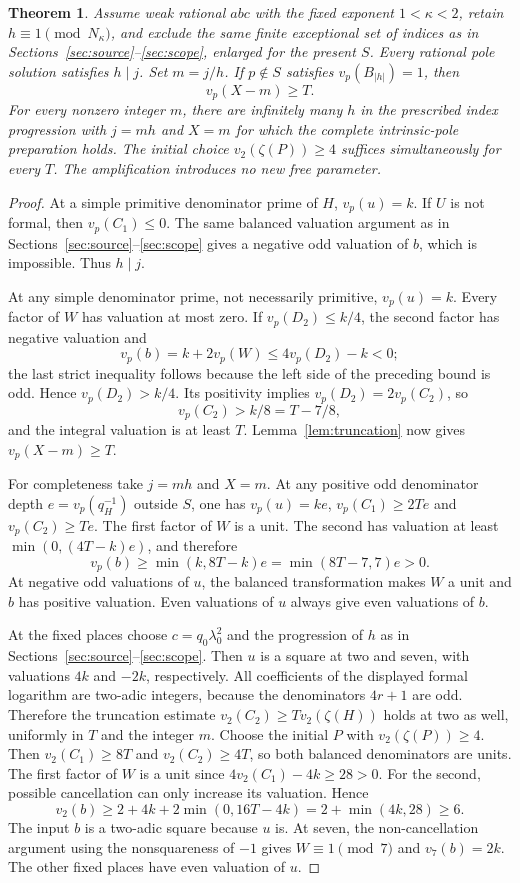 \documentclass[11pt,a4paper]{article}
\newtheorem{theorem}{Theorem}[section]
\begin{document}
\begin{theorem}\label{thm:amplified}
Assume weak rational $abc$ with the fixed exponent $1<\kappa<2$,
retain $h\equiv1\pmod{N_\kappa}$, and exclude the
same finite exceptional set of indices as in Sections~\ref{sec:source}--\ref{sec:scope}, enlarged
for the present $S$. Every rational pole solution satisfies
$h\mid j$. Set $m=j/h$.
If $p\notin S$ satisfies $v_p(B_{|h|})=1$, then
\[
                              v_p(X-m)\ge T.
\]
For every nonzero integer $m$, there are infinitely many $h$
in the prescribed index progression
with $j=mh$ and $X=m$ for which the complete intrinsic-pole
preparation holds. The initial choice $v_2(\zeta(P))\ge4$
suffices simultaneously for every $T$. The amplification introduces no new
free parameter.
\end{theorem}
\begin{proof}
At a simple primitive denominator prime of $H$, $v_p(u)=k$.
If $U$ is not formal, then $v_p(C_1)\le0$. The same balanced
valuation argument as in Sections~\ref{sec:source}--\ref{sec:scope} gives a negative odd
valuation of $b$, which is impossible. Thus $h\mid j$.

At any simple denominator prime, not necessarily primitive,
$v_p(u)=k$. Every factor of $W$ has valuation at most zero.
If $v_p(D_2)\le k/4$, the second factor has negative valuation
and
\[
 v_p(b)=k+2v_p(W)\le4v_p(D_2)-k<0;
\]
the last strict inequality follows because the left side of
the preceding bound is odd. Hence $v_p(D_2)>k/4$.
Its positivity implies $v_p(D_2)=2v_p(C_2)$, so
\[
                      v_p(C_2)>k/8=T-7/8,
\]
and the integral valuation is at least $T$.
Lemma~\ref{lem:truncation} now gives $v_p(X-m)\ge T$.

For completeness take $j=mh$ and $X=m$. At any positive odd
denominator depth $e=v_p(q_H^{-1})$ outside $S$, one has
$v_p(u)=ke$, $v_p(C_1)\ge2Te$ and $v_p(C_2)\ge Te$.
The first factor of $W$ is a unit. The second has valuation
at least $\min(0,(4T-k)e)$, and therefore
\[
 v_p(b)\ge\min(k,8T-k)e=\min(8T-7,7)e>0.
\]
At negative odd valuations of $u$, the balanced transformation
makes $W$ a unit and $b$ has positive valuation. Even
valuations of $u$ always give even valuations of $b$.

At the fixed places choose $c=q_0\lambda_0^2$ and the progression of $h$
as in Sections~\ref{sec:source}--\ref{sec:scope}. Then $u$ is a square at two and seven,
with valuations $4k$ and $-2k$, respectively. All coefficients
of the displayed formal logarithm are two-adic integers,
because the denominators $4r+1$ are odd. Therefore the truncation
estimate $v_2(C_2)\ge T v_2(\zeta(H))$ holds at two as well,
uniformly in $T$ and the integer $m$.
Choose the initial $P$ with $v_2(\zeta(P))\ge4$.
Then $v_2(C_1)\ge8T$ and $v_2(C_2)\ge4T$, so both
balanced denominators are units. The first factor of $W$ is
a unit since $4v_2(C_1)-4k\ge28>0$. For the second,
possible cancellation can only increase its valuation. Hence
\[
 v_2(b)\ge2+4k+2\min(0,16T-4k)
             =2+\min(4k,28)\ge6.
\]
The input $b$ is a two-adic square because $u$ is.
At seven, the non-cancellation argument using the nonsquareness
of $-1$ gives $W\equiv1\pmod7$ and $v_7(b)=2k$.
The other fixed places have even valuation of $u$.


\end{proof}
\end{document}
